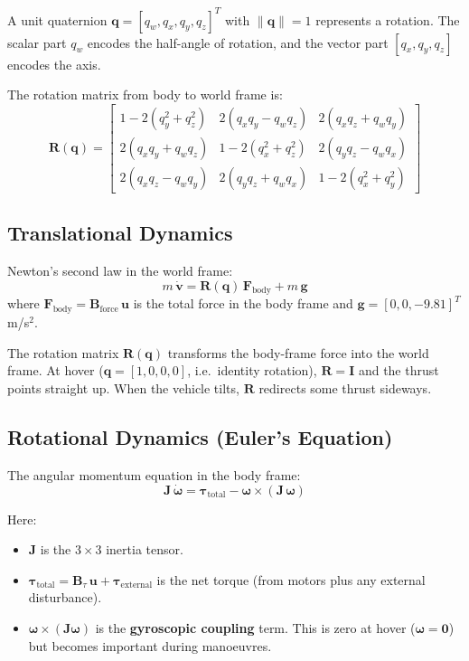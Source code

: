 \documentclass[12pt, a4paper]{article}
\newcommand{\bu}{\bm{u}}
\newcommand{\bq}{\bm{q}}
\newcommand{\bomega}{\bm{\omega}}
\newcommand{\btau}{\bm{\tau}}
\newcommand{\bF}{\bm{F}}
\newcommand{\bJ}{\bm{J}}
\newcommand{\bB}{\bm{B}}
\newcommand{\bI}{\bm{I}}
\begin{document}
A unit quaternion $\bq = [q_w, q_x, q_y, q_z]^T$ with $\|\bq\| = 1$ represents a rotation.  The scalar part $q_w$ encodes the half-angle of rotation, and the vector part $[q_x, q_y, q_z]$ encodes the axis.

The rotation matrix from body to world frame is:
\begin{equation}
    \bm{R}(\bq) = \begin{bmatrix}
        1 - 2(q_y^2 + q_z^2) & 2(q_x q_y - q_w q_z) & 2(q_x q_z + q_w q_y) \\
        2(q_x q_y + q_w q_z) & 1 - 2(q_x^2 + q_z^2) & 2(q_y q_z - q_w q_x) \\
        2(q_x q_z - q_w q_y) & 2(q_y q_z + q_w q_x) & 1 - 2(q_x^2 + q_y^2)
    \end{bmatrix}
\end{equation}

\subsection{Translational Dynamics}

Newton's second law in the world frame:
\begin{equation}
    m \, \dot{\bm{v}} = \bm{R}(\bq) \, \bF_{\text{body}} + m \, \bm{g}
    \label{eq:trans_dyn}
\end{equation}
where $\bF_{\text{body}} = \bB_{\text{force}} \, \bu$ is the total force in the body frame and $\bm{g} = [0, 0, -9.81]^T$ m/s$^2$.

The rotation matrix $\bm{R}(\bq)$ transforms the body-frame force into the world frame.  At hover ($\bq = [1,0,0,0]$, i.e.\ identity rotation), $\bm{R} = \bI$ and the thrust points straight up.  When the vehicle tilts, $\bm{R}$ redirects some thrust sideways.

\subsection{Rotational Dynamics (Euler's Equation)}

The angular momentum equation in the body frame:
\begin{equation}
    \bJ \, \dot{\bomega} = \btau_{\text{total}} - \bomega \times (\bJ \, \bomega)
    \label{eq:euler_eq}
\end{equation}

Here:
\begin{itemize}
    \item $\bJ$ is the $3 \times 3$ inertia tensor.
    \item $\btau_{\text{total}} = \bB_\tau \, \bu + \btau_{\text{external}}$ is the net torque (from motors plus any external disturbance).
    \item $\bomega \times (\bJ \bomega)$ is the \textbf{gyroscopic coupling} term.  This is zero at hover ($\bomega = \bm{0}$) but becomes important during manoeuvres.
\end{itemize}
\end{document}
